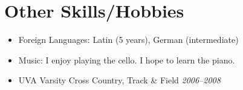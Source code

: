 \documentclass[a4paper,11pt]{article}
\begin{document}

\vskip 4pt
\section*{Other Skills/Hobbies}
\vskip 5pt

  \begin{itemize}
    \item Foreign Languages: Latin (5 years), German (intermediate)
    \item Music: I enjoy playing the cello. I hope to learn the piano.
    \item UVA Varsity Cross Country, Track \& Field \hfill \textit{2006--2008}
  \end{itemize}
\end{document}

